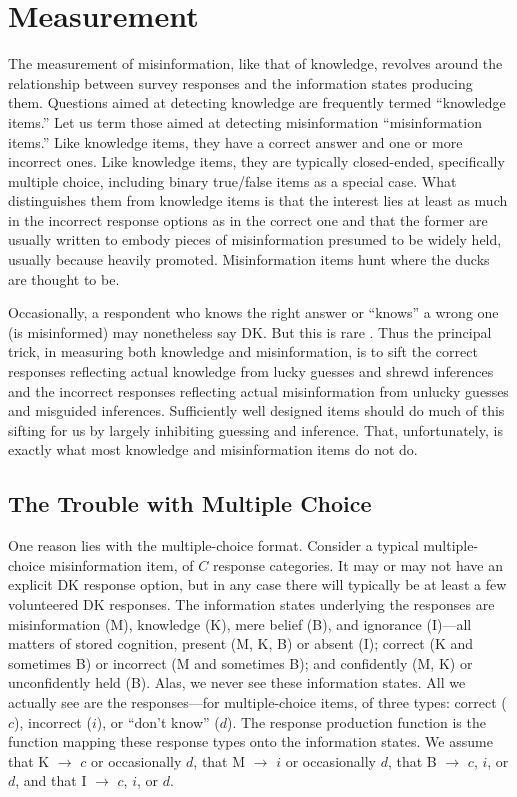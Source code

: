 \documentclass[11pt]{article}
\begin{document}
\section{Measurement}

The measurement of misinformation, like that of knowledge, revolves around the relationship between survey responses and the information states producing them. Questions aimed at detecting knowledge are frequently termed ``knowledge items.'' Let us term those aimed at detecting misinformation ``misinformation items.'' Like knowledge items, they have a correct answer and one or more incorrect ones. Like knowledge items, they are typically closed-ended, specifically multiple choice, including binary true/false items as a special case. What distinguishes them from knowledge items is that the interest lies at least as much in the incorrect response options as in the correct one and that the former are usually written to embody pieces of misinformation presumed to be widely held, usually because heavily promoted. Misinformation items hunt where the ducks are thought to be.

Occasionally, a respondent who knows the right answer or ``knows'' a wrong one (is misinformed) may nonetheless say DK. But this is rare \citep{luskin2011, sturgis2008}. Thus the principal trick, in measuring both knowledge and misinformation, is to sift the correct responses reflecting actual knowledge from lucky guesses and shrewd inferences and the incorrect responses reflecting actual misinformation from unlucky guesses and misguided inferences. Sufficiently well designed items should do much of this sifting for us by largely inhibiting guessing and inference. That, unfortunately, is exactly what most knowledge and misinformation items do not do.

\subsection{The Trouble with Multiple Choice}

One reason lies with the multiple-choice format. Consider a typical multiple-choice misinformation item, of $C$ response categories. It may or may not have an explicit DK response option, but in any case there will typically be at least a few volunteered DK responses. The information states underlying the responses are misinformation (M), knowledge (K), mere belief (B), and ignorance (I)---all matters of stored cognition, present (M, K, B) or absent (I); correct (K and sometimes B) or incorrect (M and sometimes B); and confidently (M, K) or unconfidently held (B). Alas, we never see these information states. All we actually see are the responses---for multiple-choice items, of three types: correct ($c$), incorrect ($i$), or ``don't know'' ($d$). The response production function is the function mapping these response types onto the information states. We assume that K $\rightarrow$ $c$ or occasionally $d$, that M $\rightarrow$ $i$ or occasionally $d$, that B $\rightarrow$ $c$, $i$, or $d$, and that I $\rightarrow$ $c$, $i$, or $d$.
\end{document}

